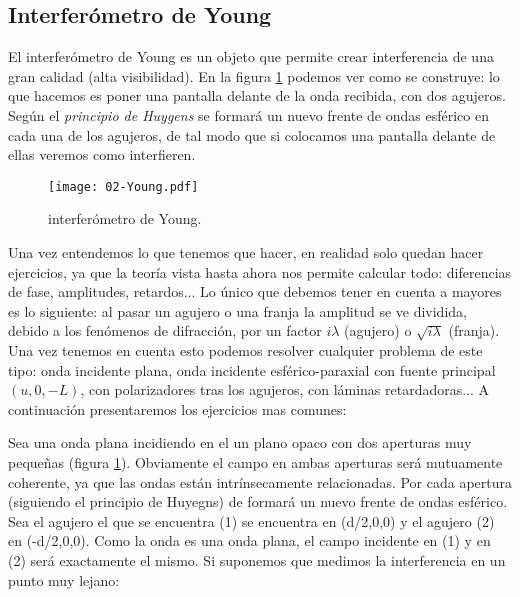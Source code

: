 \documentclass[12pt,a4paper]{book}
\numberwithin{equation}{section}
\numberwithin{figure}{section}
\newcommand{\1}{_{(1)}}
\newcommand{\2}{_{(2)}}
\theoremstyle{definition}
\begin{document}
\subsection{Interferómetro de Young}

El interferómetro de Young es un objeto que permite crear interferencia de una gran calidad (alta visibilidad). En la figura \ref{Fig:02.07-1} podemos ver como se construye: lo que hacemos es poner una pantalla delante de la onda recibida, con dos agujeros. Según el \textit{principio de Huygens} se formará un nuevo frente de ondas esférico en cada una de los agujeros, de tal modo que si colocamos una pantalla delante de ellas veremos como interfieren. \\

\begin{figure}[h!] \centering
\texttt{[image: 02-Young.pdf]}
\caption{interferómetro de Young.} \label{Fig:02.07-1}
\end{figure}

Una vez entendemos lo que tenemos que hacer, en realidad solo quedan hacer ejercicios, ya que la teoría vista hasta ahora nos permite calcular todo: diferencias de fase, amplitudes, retardos... Lo único que debemos tener en cuenta a mayores es lo siguiente: al pasar un agujero o una franja la amplitud se ve dividida, debido a los fenómenos de difracción, por un factor $i \lambda$ (agujero) o $\sqrt{i\lambda}$ (franja). Una vez tenemos en cuenta esto podemos resolver cualquier problema de este tipo: onda incidente plana, onda incidente esférico-paraxial con fuente principal $(u,0,-L)$, con polarizadores tras los agujeros, con láminas retardadoras...  A continuación presentaremos los ejercicios mas comunes: \\



\hrulefill

Sea una onda plana incidiendo en el un plano opaco con dos aperturas muy pequeñas (figura \ref{Fig:02.07-1}). Obviamente el campo en ambas aperturas será mutuamente coherente, ya que las ondas están intrínsecamente relacionadas. Por cada apertura (siguiendo el principio de Huyegns) de formará un nuevo frente de ondas esférico. Sea el agujero el que se encuentra (1) se encuentra en (d/2,0,0) y el agujero (2) en (-d/2,0,0). Como la onda es una onda plana, el campo incidente en (1) y en (2) será exactamente el mismo. Si suponemos que medimos la interferencia en un punto muy lejano:
\end{document}
